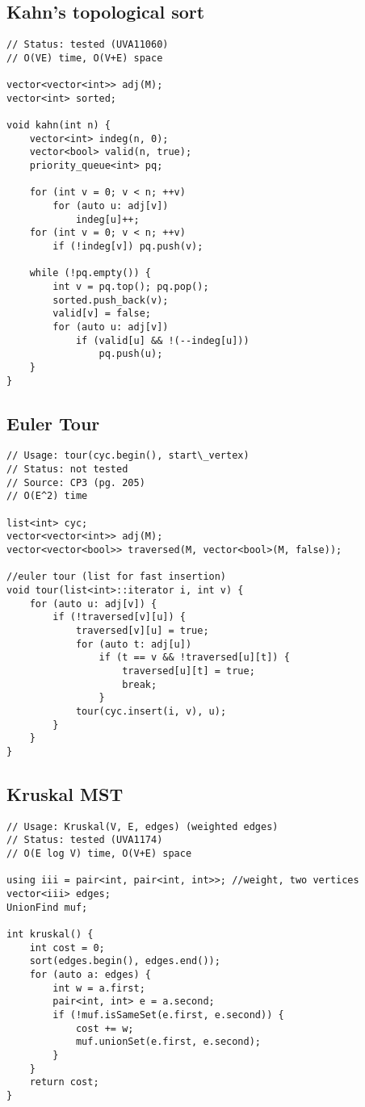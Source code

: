 \documentclass[12pt, a4paper, twoside]{article}
\begin{document}
\subsection{Kahn's topological sort}
\begin{lstlisting}
// Status: tested (UVA11060)
// O(VE) time, O(V+E) space

vector<vector<int>> adj(M);
vector<int> sorted;

void kahn(int n) {
	vector<int> indeg(n, 0);
	vector<bool> valid(n, true);
	priority_queue<int> pq;

	for (int v = 0; v < n; ++v)
		for (auto u: adj[v])
			indeg[u]++;
	for (int v = 0; v < n; ++v)
		if (!indeg[v]) pq.push(v);

	while (!pq.empty()) {
		int v = pq.top(); pq.pop();
		sorted.push_back(v);
		valid[v] = false;
		for (auto u: adj[v])
			if (valid[u] && !(--indeg[u]))
				pq.push(u);
	}
}
\end{lstlisting}

\subsection{Euler Tour}
\begin{lstlisting}
// Usage: tour(cyc.begin(), start\_vertex)
// Status: not tested
// Source: CP3 (pg. 205)
// O(E^2) time

list<int> cyc;
vector<vector<int>> adj(M);
vector<vector<bool>> traversed(M, vector<bool>(M, false));

//euler tour (list for fast insertion)
void tour(list<int>::iterator i, int v) {
	for (auto u: adj[v]) {
		if (!traversed[v][u]) {
			traversed[v][u] = true;
			for (auto t: adj[u])
				if (t == v && !traversed[u][t]) {
					traversed[u][t] = true;
					break;
				}
			tour(cyc.insert(i, v), u);
		}
	}
}
\end{lstlisting}

\subsection{Kruskal MST}
\begin{lstlisting}
// Usage: Kruskal(V, E, edges) (weighted edges)
// Status: tested (UVA1174)
// O(E log V) time, O(V+E) space

using iii = pair<int, pair<int, int>>; //weight, two vertices
vector<iii> edges;
UnionFind muf;

int kruskal() {
	int cost = 0;
	sort(edges.begin(), edges.end());
	for (auto a: edges) {
		int w = a.first;
		pair<int, int> e = a.second;
		if (!muf.isSameSet(e.first, e.second)) {
			cost += w;
			muf.unionSet(e.first, e.second);
		}
	}
	return cost;
}
\end{lstlisting}
\end{document}
